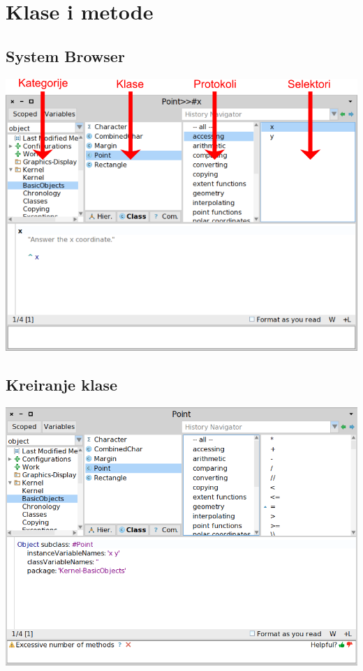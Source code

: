 \documentclass[presentation]{beamer}
\begin{document}
\section{Klase i metode}
\label{sec:org5e95c4f}
\subsection{System Browser}
\label{sec:org73995f2}

\begin{center}
\includegraphics[width=.9\linewidth]{./slike/browser.png}
\end{center}

\subsection{Kreiranje klase}
\label{sec:org49a5bcf}

\begin{center}
\includegraphics[width=.9\linewidth]{./slike/point_class.png}
\end{center}
\end{document}
